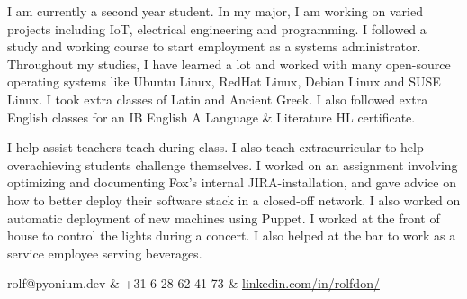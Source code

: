 





\secfont


{
    {
    I am currently a second year student. In my major, I am working on varied projects including IoT, electrical engineering and programming.
    }
    {
    I followed a study and working course to start employment as a systems administrator. Throughout my studies, I have learned a lot and worked with many open-source operating systems like Ubuntu Linux, RedHat Linux, Debian Linux and SUSE Linux.
    }
    {
    I took extra classes of Latin and Ancient Greek. I also followed extra English classes for an IB English A Language \& Literature HL certificate.
    }
}

{
    {
    I help assist teachers teach during class. I also teach extracurricular to help overachieving students challenge themselves.
    }
    {
    I worked on an assignment involving optimizing and documenting Fox's internal JIRA-installation, and gave advice on how to better deploy their software stack in a closed-off network. I also worked on automatic deployment of new machines using Puppet.
    }
    {
    I worked at the front of house to control the lights during a concert. I also helped at the bar to work as a service employee serving beverages.
    }
}

{
}

\vspace{1cm}

{
    rolf@pyonium.dev & +31 6 28 62 41 73 & \href{https://www.linkedin.com/in/rolfdon/}{linkedin.com/in/rolfdon/} 
}


